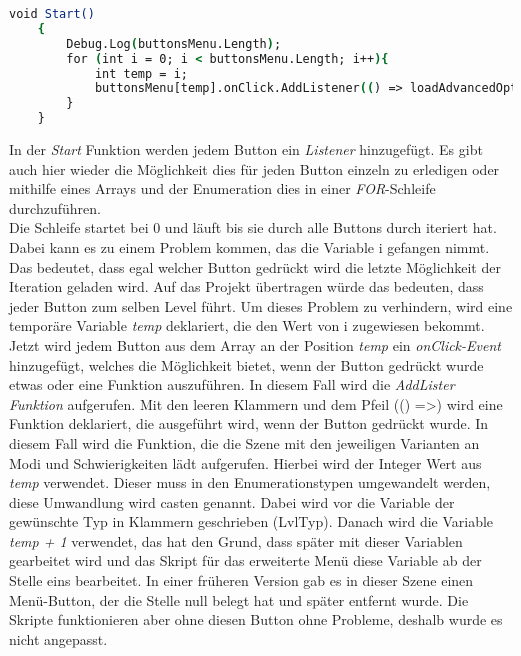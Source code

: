 \begin{lstlisting}[language=csh, caption={MenuPickLevel.cs Klasse Menü Start-Funktion}]
	void Start()
	{
		Debug.Log(buttonsMenu.Length);
		for (int i = 0; i < buttonsMenu.Length; i++){
			int temp = i;
			buttonsMenu[temp].onClick.AddListener(() => loadAdvancedOptions((LvlType)temp + 1));
		}
	}
\end{lstlisting}
In der \textit{Start} Funktion werden jedem Button ein \textit{Listener} hinzugefügt. Es gibt auch hier wieder die Möglichkeit dies für jeden Button einzeln zu erledigen oder mithilfe eines Arrays und der Enumeration dies in einer \textit{FOR}-Schleife durchzuführen.\\
Die Schleife startet bei 0 und läuft bis sie durch alle Buttons durch iteriert hat. Dabei kann es zu einem Problem kommen, das die Variable i gefangen nimmt. Das bedeutet, dass egal welcher Button gedrückt wird die letzte Möglichkeit der Iteration geladen wird. Auf das Projekt übertragen würde das bedeuten, dass jeder Button zum selben Level führt. Um dieses Problem zu verhindern, wird eine temporäre Variable \textit{temp} deklariert, die den Wert von i zugewiesen bekommt. Jetzt wird jedem Button aus dem Array an der Position \textit{temp} ein \textit{onClick-Event} hinzugefügt, welches die Möglichkeit bietet, wenn der Button gedrückt wurde etwas oder eine Funktion auszuführen. In diesem Fall wird die \textit{AddLister Funktion} aufgerufen. Mit den leeren Klammern und dem Pfeil (() =>) wird eine Funktion deklariert, die ausgeführt wird, wenn der Button gedrückt wurde. In diesem Fall wird die Funktion, die die Szene mit den jeweiligen Varianten an Modi und Schwierigkeiten lädt aufgerufen. Hierbei wird der Integer Wert aus \textit{temp} verwendet. Dieser muss in den Enumerationstypen umgewandelt werden, diese Umwandlung wird casten genannt. Dabei wird vor die Variable der gewünschte Typ in Klammern geschrieben (LvlTyp). Danach wird die Variable \textit{temp + 1} verwendet, das hat den Grund, dass später mit dieser Variablen gearbeitet wird und das Skript für das erweiterte Menü diese Variable ab der Stelle eins bearbeitet. In einer früheren Version gab es in dieser Szene einen Menü-Button, der die Stelle null belegt hat und später entfernt wurde. Die Skripte funktionieren aber ohne diesen Button ohne Probleme, deshalb wurde es nicht angepasst.\\

